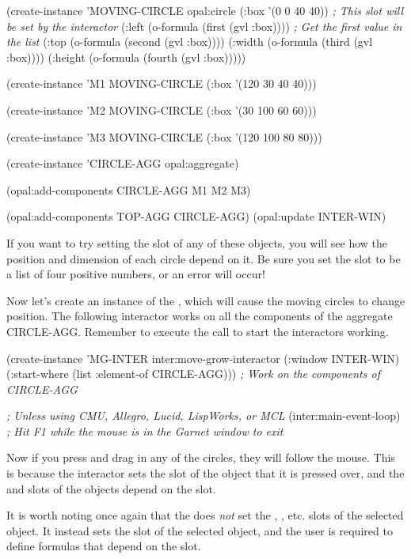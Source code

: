 \begin{programexample}
(create-instance 'MOVING-CIRCLE opal:circle
   (:box '(0 0 40 40))  {\it ; This slot will be set by the interactor}
   (:left (o-formula (first (gvl :box))))     {\it ; Get the first value in the list}
   (:top (o-formula (second (gvl :box))))
   (:width (o-formula (third (gvl :box))))
   (:height (o-formula (fourth (gvl :box)))))

(create-instance 'M1 MOVING-CIRCLE
   (:box '(120 30 40 40)))

(create-instance 'M2 MOVING-CIRCLE
   (:box '(30 100 60 60)))

(create-instance 'M3 MOVING-CIRCLE
   (:box '(120 100 80 80)))

(create-instance 'CIRCLE-AGG opal:aggregate)

(opal:add-components CIRCLE-AGG M1 M2 M3)		

(opal:add-components TOP-AGG CIRCLE-AGG)
(opal:update INTER-WIN)
\end{programexample}

If you want to try setting the  slot of any of these objects,
you will see how the position and dimension of each circle depend on
it.  Be sure you set the  slot to be a list of four positive
numbers, or an error will occur!

Now let's create an instance of the , which
will cause the moving circles to change position.  The following
interactor works on all the components of the aggregate CIRCLE-AGG.
Remember to execute the  call to start the
interactors working.

\begin{programexample}
(create-instance 'MG-INTER inter:move-grow-interactor
   (:window INTER-WIN)
   (:start-where (list :element-of CIRCLE-AGG)))    {\it ; Work on the components of CIRCLE-AGG}

{\it ; Unless using CMU, Allegro, Lucid, LispWorks, or MCL}
(inter:main-event-loop)
{\it ; Hit F1 while the mouse is in the Garnet window to exit}
\end{programexample}

Now if you press and drag in any of the circles, they will follow the
mouse.  This is because the interactor sets the  slot of the
object that it is pressed over, and the  and  slots
of the objects depend on the  slot.

It is worth noting once again that the  does
{\it not} set the , , etc. slots of the selected
object.  It instead sets the {\it {}} slot of the selected
object, and the user is required to define formulas that depend on the
 slot.


